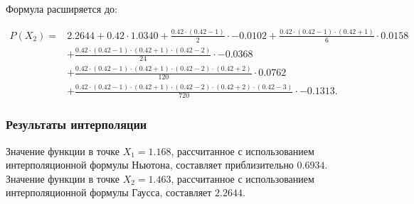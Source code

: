 \documentclass{article}
\begin{document}
                  Формула расширяется до:

                  \[
                  \begin{aligned}
                  P(X_2) = & 2.2644 + 0.42 \cdot 1.0340 + \frac{0.42 \cdot (0.42-1)}{2} \cdot -0.0102 + \frac{0.42 \cdot (0.42-1) \cdot (0.42+1)}{6} \cdot 0.0158 \\
                        & + \frac{0.42 \cdot (0.42-1) \cdot (0.42+1) \cdot (0.42-2)}{24} \cdot -0.0368 \\
                        & + \frac{0.42 \cdot (0.42-1) \cdot (0.42+1) \cdot (0.42-2) \cdot (0.42+2)}{120} \cdot 0.0762 \\
                        & + \frac{0.42 \cdot (0.42-1) \cdot (0.42+1) \cdot (0.42-2) \cdot (0.42+2) \cdot (0.42-3)}{720} \cdot -0.1313.
                  \end{aligned}
                  \]
            \subsubsection{Результаты интерполяции}
                  
                  Значение функции в точке \( X_1 = 1.168 \), рассчитанное с использованием интерполяционной формулы Ньютона, составляет приблизительно \( 0.6934 \).
                  \\
                  Значение функции в точке \( X_2 = 1.463 \), рассчитанное с использованием интерполяционной формулы Гаусса, составляет \( 2.2644 \).
            
\end{document}
